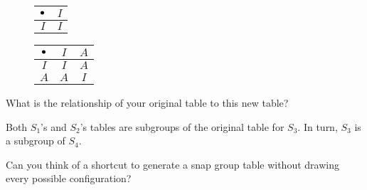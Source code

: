 \documentclass[../gatm_answers.tex]{subfiles}
\begin{document}
\begin{figure}[h]
	\begin{center}
		\begin{minipage}[b]{0.45\textwidth}
			\centering
			\begin{tabular}{c|c}
				\hline
				$\bullet$ & $I$ \\ \hline
				\rowcolor{light-gray}
				$I$ & $I$ \\ \hline
			\end{tabular}
			\vspace*{0.5\baselineskip}
		\end{minipage}
		\hfill
		\begin{minipage}[b]{0.45\textwidth}
			\centering
			\begin{tabular}{c|cc}
				\hline
				$\bullet$ & $I$ & $A$ \\ \hline
				\rowcolor{light-gray}
				$I$ & $I$ & $A$ \\
				$A$ & $A$ & $I$ \\ \hline
			\end{tabular}
			\vspace*{0.5\baselineskip}
		\end{minipage}
	\end{center}
	\vspace*{-2\baselineskip}
	\begin{center}
		\begin{minipage}[t]{0.45\textwidth}
		\end{minipage}
		\hfill
		\begin{minipage}[t]{0.45\textwidth}
		\end{minipage}
	\end{center}
	\vspace*{-2\baselineskip}
\end{figure}

\begin{inner_problem}
\item What is the relationship of your original table to this new table?
\end{inner_problem}

\noindent Both $S_1$'s and $S_2$'s tables are subgroups of the original table for $S_3$. In turn, $S_3$ is a subgroup of $S_4$.

\begin{outer_problem}
\item Can you think of a shortcut to generate a snap group table without drawing every possible configuration?
\end{outer_problem}
\end{document}
